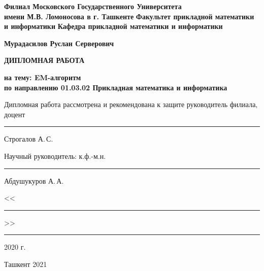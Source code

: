 \begin{titlepage}
\begin{center}
        
\textbf{Филиал Московского Государственного Университета\\
имени М.В. Ломоносова в г. Ташкенте} \vskip 0.3cm
\textbf{Факультет прикладной математики и информатики} \vskip 0.3cm
\textbf{Кафедра прикладной математики и информатики} \vskip 3cm
            
\textbf{Мурадасилов Руслан Серверович} \vskip 1cm
            
\textbf{ДИПЛОМНАЯ РАБОТА} \vskip 1cm
            
\normalsize { \textbf{на тему: \guillemotleft EM-алгоритм\guillemotright \\ \vskip 0.5cm
по направлению 01.03.02 \guillemotleft Прикладная математика и информатика\guillemotright} }
\vskip 1.5cm
\end{center}

\begin{flushleft}
Дипломная работа рассмотрена и рекомендована к защите \vskip 5pt
руководитель филиала, доцент \rule{5.2cm}{0.5pt} Строгалов А.\,С.
\end{flushleft}
\begin{flushleft}
Научный руководитель:\vskip 5pt
к.ф.-м.н. \rule{9.5cm}{0.5pt} Абдушукуров А.\,А.
\end{flushleft}
          
\begin{flushright}
<<\rule{1cm}{0.5pt}>>\rule{3.5cm}{0.5pt} 2020 г.
\end{flushright}
        
\vfill   
\begin{center}
Ташкент 2021
\end{center}
\end{titlepage}